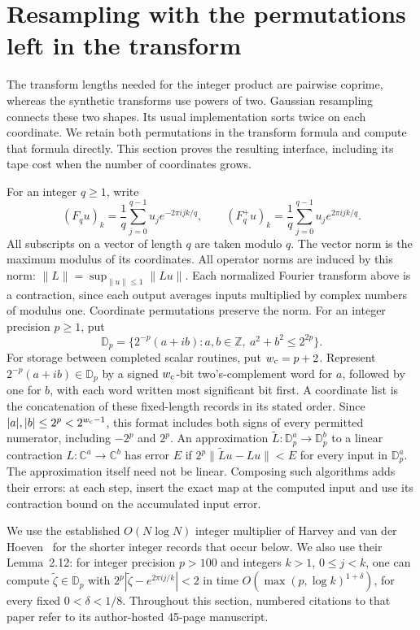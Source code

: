 \section{Resampling with the permutations left in the transform}
\label{sec:resampling}

The transform lengths needed for the integer product are pairwise coprime,
whereas the synthetic transforms use powers of two. Gaussian resampling
connects these two shapes. Its usual implementation sorts twice on each
coordinate. We retain both permutations in the transform formula and
compute that formula directly. This section proves the resulting interface,
including its tape cost when the number of coordinates grows.

For an integer $q\geq 1$, write
\[
 (F_q u)_k=\frac1q\sum_{j=0}^{q-1}u_j e^{-2\pi i jk/q},
 \qquad
 (F_q^+ u)_k=\frac1q\sum_{j=0}^{q-1}u_j e^{2\pi i jk/q}.
\]
All subscripts on a vector of length $q$ are taken modulo $q$.
The vector norm is the maximum modulus of its coordinates. All operator
norms are induced by this norm: $\|L\|=\sup_{\|u\|\leq1}\|Lu\|$.
Each normalized Fourier transform above is a contraction, since each
output averages inputs multiplied by complex numbers of modulus one. Coordinate
permutations preserve the norm.
For an integer precision $p\geq1$, put
\[
 \mathbb D_p=\{2^{-p}(a+ib):a,b\in\mathbb Z,\ a^2+b^2\leq 2^{2p}\}.
\]
For storage between completed scalar routines, put $w_{\rm c}=p+2$.
Represent $2^{-p}(a+ib)\in\mathbb D_p$ by a signed $w_{\rm c}$-bit
two's-complement word for $a$, followed by one for $b$, with each word
written most significant bit first. A coordinate list is the
concatenation of these fixed-length records in its stated order. Since
$|a|,|b|\leq2^p<2^{w_{\rm c}-1}$, this format includes both signs of
every permitted numerator, including $-2^p$ and $2^p$.
An approximation $\widetilde L:\mathbb D_p^a\to\mathbb D_p^b$
to a linear contraction $L:\mathbb C^a\to\mathbb C^b$ has error $E$
if $2^p\|\widetilde L u-Lu\|<E$ for every input in $\mathbb D_p^a$.
The approximation itself need not be linear. Composing such algorithms
adds their errors: at each step, insert the exact map at the computed
input and use its contraction bound on the accumulated input error.

We use the established $O(N\log N)$ integer multiplier of
Harvey and van der Hoeven~\cite[Theorem~1.1]{HarveyHoeven2021}
for the shorter integer records that occur below. We also use their
Lemma~2.12: for integer precision $p>100$ and integers $k>1$, $0\leq j<k$,
one can compute $\widetilde\zeta\in\mathbb D_p$ with
$2^p|\widetilde\zeta-e^{2\pi i j/k}|<2$ in time
$O(\max(p,\log k)^{1+\delta})$, for every fixed $0<\delta<1/8$.
Throughout this section, numbered citations to that paper refer to its
author-hosted 45-page manuscript.

